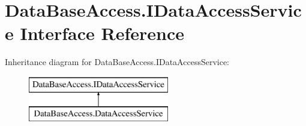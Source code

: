 \hypertarget{interfaceDataBaseAccess_1_1IDataAccessService}{}\section{Data\+Base\+Access.\+I\+Data\+Access\+Service Interface Reference}
\label{interfaceDataBaseAccess_1_1IDataAccessService}
Inheritance diagram for Data\+Base\+Access.\+I\+Data\+Access\+Service\+:\begin{figure}[H]
\begin{center}
\leavevmode
\includegraphics[height=2.000000cm]{d0/d00/interfaceDataBaseAccess_1_1IDataAccessService}
\end{center}
\end{figure}
